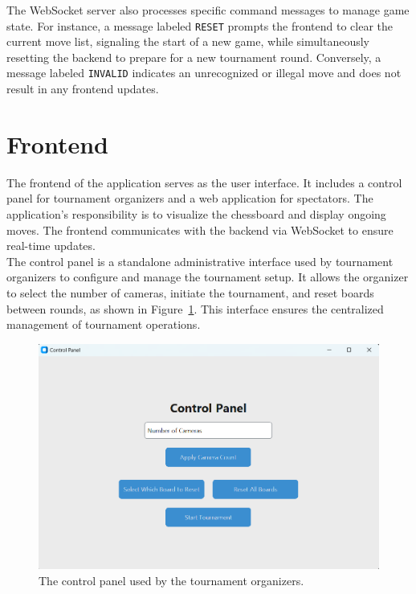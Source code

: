The WebSocket server also processes specific command messages to manage game state. For instance, a message labeled \texttt{RESET} prompts the frontend to clear the current move list, signaling the start of a new game, while simultaneously resetting the backend to prepare for a new tournament round. Conversely, a message labeled \texttt{INVALID} indicates an unrecognized or illegal move and does not result in any frontend updates. 


\section{Frontend}
\label{subsec:results-frontend}
The frontend of the application serves as the user interface. It includes a control panel for tournament organizers and a web application for spectators. The application's responsibility is to visualize the chessboard and display ongoing moves. The frontend communicates with the backend via WebSocket to ensure real-time updates. \\

The control panel is a standalone administrative interface used by tournament organizers to configure and manage the tournament setup. It allows the organizer to select the number of cameras, initiate the tournament, and reset boards between rounds, as shown in Figure~\ref{fig:control-panel}. This interface ensures the centralized management of tournament operations. \\

\newpage

\begin{figure}[h!] \centering \includegraphics[width=0.75\linewidth]{figures/results/frontend/control-panel/control-panel.png} \caption[Control panel for tournament organizers]{The control panel used by the tournament organizers.}\label{fig:control-panel} \end{figure}


